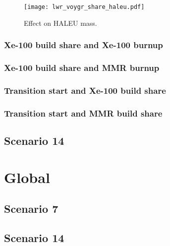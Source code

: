 \begin{figure}[ht]
    \centering
    \texttt{[image: lwr\_voygr\_share\_haleu.pdf]}
    \caption{Effect on HALEU mass.}
    \label{fig:lwr_voygr_share_haleu}
\end{figure}

\subsubsection{Xe-100 build share and Xe-100 burnup}

\subsubsection{Xe-100 build share and MMR burnup}

\subsubsection{Transition start and Xe-100 build share}

\subsubsection{Transition start and MMR build share}

\subsection{Scenario 14}

\section{Global}
\subsection{Scenario 7}

\subsection{Scenario 14}


